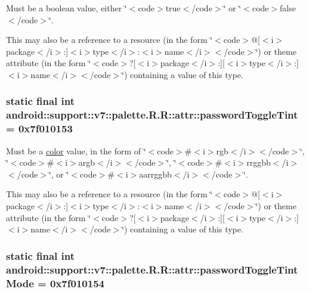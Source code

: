 Must be a boolean value, either \char`\"{}$<$code$>$true$<$/code$>$\char`\"{} or \char`\"{}$<$code$>$false$<$/code$>$\char`\"{}. 

This may also be a reference to a resource (in the form \char`\"{}$<$code$>$@\mbox{[}$<$i$>$package$<$/i$>$:\mbox{]}$<$i$>$type$<$/i$>$:$<$i$>$name$<$/i$>$$<$/code$>$\char`\"{}) or theme attribute (in the form \char`\"{}$<$code$>$?\mbox{[}$<$i$>$package$<$/i$>$:\mbox{]}\mbox{[}$<$i$>$type$<$/i$>$:\mbox{]}$<$i$>$name$<$/i$>$$<$/code$>$\char`\"{}) containing a value of this type. \hypertarget{classandroid_1_1support_1_1v7_1_1palette_1_1_r_1_1attr_f3147a0846431af43cae7dd3dd567dd3}{
\subsubsection[{passwordToggleTint}]{\setlength{\rightskip}{0pt plus 5cm}static final int android::support::v7::palette.R.R::attr::passwordToggleTint = 0x7f010153}}
\label{classandroid_1_1support_1_1v7_1_1palette_1_1_r_1_1attr_f3147a0846431af43cae7dd3dd567dd3}


Must be a \hyperlink{classandroid_1_1support_1_1v7_1_1palette_1_1_r_1_1color}{color} value, in the form of \char`\"{}$<$code$>$\#$<$i$>$rgb$<$/i$>$$<$/code$>$\char`\"{}, \char`\"{}$<$code$>$\#$<$i$>$argb$<$/i$>$$<$/code$>$\char`\"{}, \char`\"{}$<$code$>$\#$<$i$>$rrggbb$<$/i$>$$<$/code$>$\char`\"{}, or \char`\"{}$<$code$>$\#$<$i$>$aarrggbb$<$/i$>$$<$/code$>$\char`\"{}. 

This may also be a reference to a resource (in the form \char`\"{}$<$code$>$@\mbox{[}$<$i$>$package$<$/i$>$:\mbox{]}$<$i$>$type$<$/i$>$:$<$i$>$name$<$/i$>$$<$/code$>$\char`\"{}) or theme attribute (in the form \char`\"{}$<$code$>$?\mbox{[}$<$i$>$package$<$/i$>$:\mbox{]}\mbox{[}$<$i$>$type$<$/i$>$:\mbox{]}$<$i$>$name$<$/i$>$$<$/code$>$\char`\"{}) containing a value of this type. \hypertarget{classandroid_1_1support_1_1v7_1_1palette_1_1_r_1_1attr_fa18d7d4842a11799e0ebfb33901a856}{
\subsubsection[{passwordToggleTintMode}]{\setlength{\rightskip}{0pt plus 5cm}static final int android::support::v7::palette.R.R::attr::passwordToggleTintMode = 0x7f010154}}
\label{classandroid_1_1support_1_1v7_1_1palette_1_1_r_1_1attr_fa18d7d4842a11799e0ebfb33901a856}


